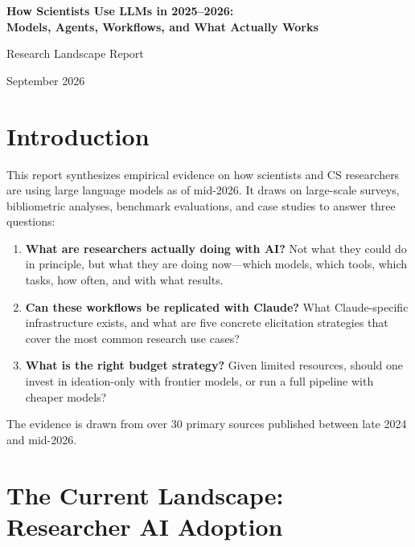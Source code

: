 \documentclass[11pt,a4paper]{article}
\begin{document}
\begin{center}
{\LARGE\bfseries How Scientists Use LLMs in 2025--2026:\\
Models, Agents, Workflows, and What Actually Works}

\vspace{0.8em}
{\large Research Landscape Report}

\vspace{0.5em}
{\normalsize September 2026}
\end{center}

\vspace{1em}

\tableofcontents
\newpage

\section{Introduction}

This report synthesizes empirical evidence on how scientists and CS researchers are using large language models as of mid-2026. It draws on large-scale surveys, bibliometric analyses, benchmark evaluations, and case studies to answer three questions:

\begin{enumerate}
\item \textbf{What are researchers actually doing with AI?} Not what they could do in principle, but what they are doing now---which models, which tools, which tasks, how often, and with what results.

\item \textbf{Can these workflows be replicated with Claude?} What Claude-specific infrastructure exists, and what are five concrete elicitation strategies that cover the most common research use cases?

\item \textbf{What is the right budget strategy?} Given limited resources, should one invest in ideation-only with frontier models, or run a full pipeline with cheaper models?
\end{enumerate}

The evidence is drawn from over 30 primary sources published between late 2024 and mid-2026.


\section{The Current Landscape: Researcher AI Adoption}
\label{sec:adoption}
\end{document}
